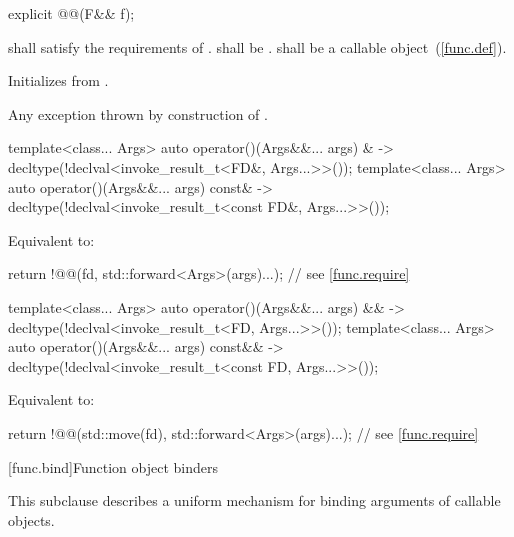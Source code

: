 \begin{itemdecl}
explicit @@(F&& f);
\end{itemdecl}

\begin{itemdescr}
\pnum
\requires
{} shall satisfy the requirements of .
 shall be .
 shall be a callable object~(\ref{func.def}).

\pnum
\effects
Initializes  from .

\pnum
\throws
Any exception thrown by construction of .
\end{itemdescr}

\begin{itemdecl}
template<class... Args>
  auto operator()(Args&&... args) &
    -> decltype(!declval<invoke_result_t<FD&, Args...>>());
template<class... Args>
  auto operator()(Args&&... args) const&
    -> decltype(!declval<invoke_result_t<const FD&, Args...>>());
\end{itemdecl}

\begin{itemdescr}
\pnum
\effects
Equivalent to:
\begin{codeblock}
return !@@(fd, std::forward<Args>(args)...);              // see \ref{func.require}
\end{codeblock}
\end{itemdescr}

\begin{itemdecl}
template<class... Args>
  auto operator()(Args&&... args) &&
    -> decltype(!declval<invoke_result_t<FD, Args...>>());
template<class... Args>
  auto operator()(Args&&... args) const&&
    -> decltype(!declval<invoke_result_t<const FD, Args...>>());
\end{itemdecl}

\begin{itemdescr}
\pnum
\effects
Equivalent to:
\begin{codeblock}
return !@@(std::move(fd), std::forward<Args>(args)...);   // see \ref{func.require}
\end{codeblock}
\end{itemdescr}

[func.bind]{Function object binders}%

\pnum
This subclause describes a uniform mechanism for binding
arguments of callable objects.

